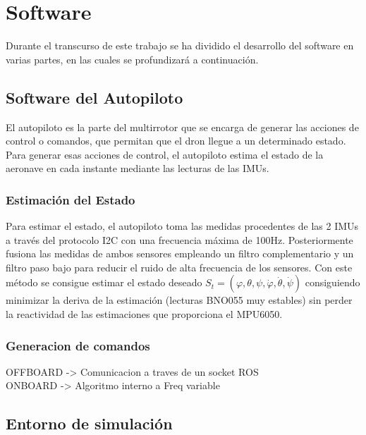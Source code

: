 \chapter{Software}

Durante el transcurso de este trabajo se ha dividido el desarrollo del software en varias partes, en las cuales se profundizará a continuación.

\section{Software del Autopiloto}
	El autopiloto es la parte del multirrotor que se encarga de generar las acciones de control o comandos, que permitan que el dron llegue a un determinado estado.
	Para generar esas acciones de control, el autopiloto estima el estado de la aeronave en cada instante mediante las lecturas de las IMUs.

\subsection{Estimación del Estado}
	Para estimar el estado, el autopiloto toma las medidas procedentes de las 2 IMUs a través del protocolo I2C con una frecuencia máxima de 100Hz.
	Posteriormente fusiona las medidas de ambos sensores empleando un filtro complementario y un filtro paso bajo para reducir el ruido de alta frecuencia de los sensores.
	Con este método se consigue estimar el estado deseado $S_t=(\varphi,\theta,\psi,\dot\varphi,\dot\theta,\dot\psi)$
	consiguiendo minimizar la deriva de la estimación (lecturas BNO055 muy estables) sin perder la reactividad de las estimaciones que proporciona el MPU6050.
	


\subsection{Generacion de comandos}

  \large OFFBOARD -> Comunicacion a traves de un socket ROS\\
  
  	ONBOARD -> Algoritmo interno a Freq variable 




\section{Entorno de simulación}




